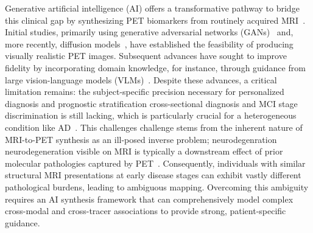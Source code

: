 \documentclass{article}
\providecommand{\DIFaddtex}[1]{{\protect\color{blue} \sf #1}} %
\providecommand{\DIFdeltex}[1]{{\protect\color{red} \scriptsize #1}} %
\providecommand{\DIFaddbegin}{} %
\providecommand{\DIFaddend}{} %
\providecommand{\DIFdelbegin}{} %
\providecommand{\DIFdelend}{} %
\providecommand{\DIFadd}[1]{\texorpdfstring{\DIFaddtex{#1}}{#1}} %
\providecommand{\DIFdel}[1]{\texorpdfstring{\DIFdeltex{#1}}{}} %
\newcommand{\DIFscaledelfig}{0.5}
\newlength{\DIFdelgraphicswidth} %
\newlength{\DIFdelgraphicsheight} %
\newcommand{\DIFaddincludegraphics}[2][]{{\color{blue}\fbox{\DIFOincludegraphics[#1]{#2}}}} %
\newcommand{\DIFdelincludegraphics}[2][]{%
\sbox{\DIFdelgraphicsbox}{\DIFOincludegraphics[#1]{#2}}%
\settoboxwidth{\DIFdelgraphicswidth}{\DIFdelgraphicsbox} %
\settoboxtotalheight{\DIFdelgraphicsheight}{\DIFdelgraphicsbox} %
\scalebox{\DIFscaledelfig}{%
\parbox[b]{\DIFdelgraphicswidth}{\usebox{\DIFdelgraphicsbox}\\[-\baselineskip] \rule{\DIFdelgraphicswidth}{0em}}\llap{\resizebox{\DIFdelgraphicswidth}{\DIFdelgraphicsheight}{%
\setlength{\unitlength}{\DIFdelgraphicswidth}%
\begin{picture}(1,1)%
\thicklines\linethickness{2pt} %
{\color[rgb]{1,0,0}\put(0,0){\framebox(1,1){}}}%
{\color[rgb]{1,0,0}\put(0,0){\line( 1,1){1}}}%
{\color[rgb]{1,0,0}\put(0,1){\line(1,-1){1}}}%
\end{picture}%
}\hspace*{3pt}}} %
} %
\DeclareRobustCommand{\DIFaddbegin}{\DIFOaddbegin \let\includegraphics\DIFaddincludegraphics} %
\DeclareRobustCommand{\DIFaddend}{\DIFOaddend \let\includegraphics\DIFOincludegraphics} %
\DeclareRobustCommand{\DIFdelbegin}{\DIFOdelbegin \let\includegraphics\DIFdelincludegraphics} %
\DeclareRobustCommand{\DIFdelend}{\DIFOaddend \let\includegraphics\DIFOincludegraphics} %
\begin{document}
Generative artificial intelligence (AI) offers a transformative pathway to bridge this clinical gap by synthesizing PET biomarkers from routinely acquired MRI~\cite{dayarathna2024deep,lee2024synthesizing}. Initial studies, primarily using generative adversarial networks (GANs)~\cite{pan2018synthesizing,pan2020spatially,apostolopoulos2022applications} and, more recently, diffusion models~\cite{xie2024synthesizing,chen2025multi,theodorou2025mri2pet}, have established the feasibility of producing visually realistic PET images. Subsequent advances have sought to improve fidelity by incorporating domain knowledge, for instance, through guidance from large vision-language models (VLMs)~\cite{wang2025unisyn,liu2025direct}.  Despite these advances, a critical limitation remains: the subject-specific precision necessary for \DIFdelbegin \DIFdel{personalized diagnosis and prognostic stratification }\DIFdelend \DIFaddbegin \DIFadd{cross-sectional diagnosis and MCI stage discrimination }\DIFaddend is still lacking, which is particularly crucial for a heterogeneous condition like AD~\cite{ossenkoppele2022amyloid}. This \DIFdelbegin \DIFdel{challenges }\DIFdelend \DIFaddbegin \DIFadd{challenge }\DIFaddend stems from the inherent nature of MRI-to-PET synthesis as an ill-posed inverse problem; \DIFdelbegin \DIFdel{neurodegenration }\DIFdelend \DIFaddbegin \DIFadd{neurodegeneration }\DIFaddend visible on MRI is typically a downstream effect of prior molecular pathologies captured by PET~\cite{jagust2018imaging}. Consequently, individuals with similar structural MRI presentations at early disease stages can exhibit vastly different pathological burdens, leading to ambiguous mapping. Overcoming this ambiguity requires an AI synthesis framework that can comprehensively model complex cross-modal and cross-tracer associations to provide strong, patient-specific guidance.
\end{document}
